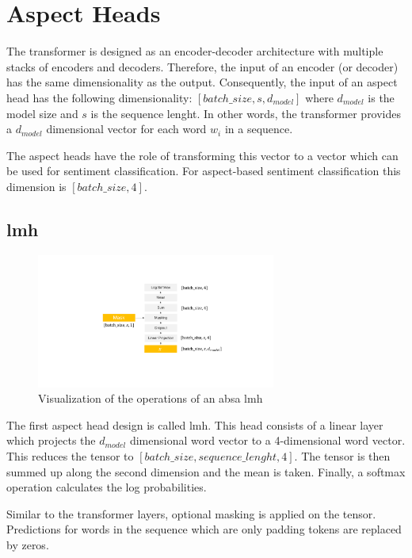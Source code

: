 \section{Aspect Heads}
\label{sec:04_aspectHeads}

The transformer is designed as an encoder-decoder architecture with multiple stacks of encoders and decoders. Therefore, the input of an encoder {(or decoder)} has the same dimensionality as the output. Consequently, the input of an aspect head has the following dimensionality: $[batch\_size, s, d_{model}]$ where $d_{model}$ is the model size and $s$ is the sequence lenght. In other words, the transformer provides a $d_{model}$ dimensional vector for each word $w_i$ in a sequence.
\medskip

The aspect heads have the role of transforming this vector to a vector which can be used for sentiment classification. For aspect-based sentiment classification this dimension is $[batch\_size, 4]$.

\subsection{\acrfull{lmh}}

\begin{figure}[htp]
	\centering
	\includegraphics[width=0.7\textwidth]{figures/04_method/04_lmh}
	\caption{Visualization of the operations of an \gls{absa} \acrfull{lmh}}
	\label{fig:04_lmh}
\end{figure}

The first aspect head design is called \acrfull{lmh}. This head consists of a linear layer which projects the $d_{model}$ dimensional word vector to a 4-dimensional word vector. This reduces the tensor to $[batch\_size, sequence\_lenght, 4]$. The tensor is then summed up along the second dimension and the mean is taken. Finally, a softmax operation calculates the log probabilities.

Similar to the transformer layers, optional masking is applied on the tensor. Predictions for words in the sequence which are only padding tokens are replaced by zeros.

